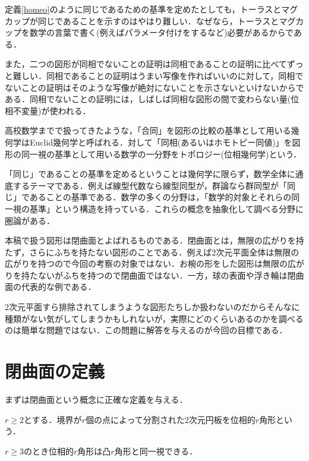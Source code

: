 \documentclass[dvipdfmx,uplatex]{jsarticle}
\begin{document}
\begin{remark}
定義\ref{homeo}のように同じであるための基準を定めたとしても，トーラスとマグカップが同じであることを示すのはやはり難しい．なぜなら，トーラスとマグカップを数学の言葉で書く(例えばパラメータ付けをするなど)必要があるからである．

また，二つの図形が同相でないことの証明は同相であることの証明に比べてずっと難しい．同相であることの証明はうまい写像を作ればいいのに対して，同相でないことの証明はそのような写像が絶対にないことを示さないといけないからである．同相でないことの証明には，しばしば同相な図形の間で変わらない量(位相不変量)が使われる．
\end{remark}

高校数学までで扱ってきたような，「合同」を図形の比較の基準として用いる幾何学はEuclid幾何学と呼ばれる．対して「同相(あるいはホモトピー同値)」を図形の同一視の基準として用いる数学の一分野をトポロジー(位相幾何学)という．

\begin{remark}
「同じ」であることの基準を定めるということは幾何学に限らず，数学全体に通底するテーマである．例えば線型代数なら線型同型が，群論なら群同型が「同じ」であることの基準である．数学の多くの分野は，「数学的対象とそれらの同一視の基準」という構造を持っている．これらの概念を抽象化して調べる分野に圏論がある．
\end{remark}

本稿で扱う図形は閉曲面とよばれるものである．閉曲面とは，無限の広がりを持たず，さらにふちを持たない図形のことである．例えば2次元平面全体は無限の広がりを持つので今回の考察の対象ではない．お椀の形をした図形は無限の広がりを持たないがふちを持つので閉曲面ではない．一方，球の表面や浮き輪は閉曲面の代表的な例である．

2次元平面すら排除されてしまうような図形たちしか扱わないのだからそんなに種類がない気がしてしまうかもしれないが，実際にどのくらいあるのかを調べるのは簡単な問題ではない．この問題に解答を与えるのが今回の目標である．

\section{閉曲面の定義}
まずは閉曲面という概念に正確な定義を与える．

\begin{definition}
$r\geq 2$とする．境界が$r$個の点によって分割された2次元円板を位相的$r$角形という．
\end{definition}

$r\geq 3$のとき位相的$r$角形は凸$r$角形と同一視できる．
\end{document}
